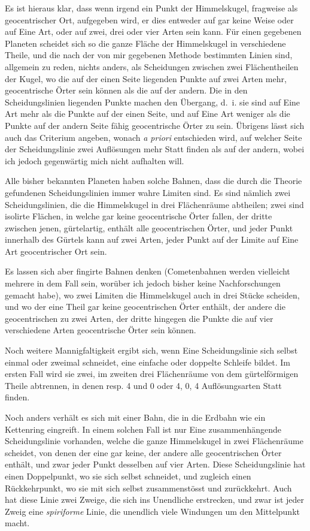 \documentclass[11pt,a4paper]{book}
\begin{document}
Es ist hieraus klar, dass wenn irgend ein Punkt der Himmelskugel, fragweise als geocentrischer Ort, aufgegeben wird, er dies entweder auf gar keine Weise oder auf Eine Art, oder auf zwei, drei oder vier Arten sein kann. Für einen gegebenen Planeten scheidet sich so die ganze Fläche der Himmelskugel in verschiedene Theile, und die nach der von mir gegebenen Methode bestimmten Linien sind, allgemein zu reden, nichts anders, als Scheidungen zwischen zwei Flächentheilen der Kugel, wo die auf der einen Seite liegenden Punkte auf zwei Arten mehr, geocentrische Örter sein können als die auf der andern. Die in den Scheidungslinien liegenden Punkte machen den Übergang, d.~i. sie sind auf Eine Art mehr als die Punkte auf der einen Seite, und auf Eine Art weniger als die Punkte auf der andern Seite fähig geocentrische Örter zu sein. Übrigens lässt sich auch das Criterium angeben, wonach \textit{a priori} entschieden wird, auf welcher Seite der Scheidungslinie zwei Auflösungen mehr Statt finden als auf der andern, wobei ich jedoch gegenwärtig mich nicht aufhalten will.

Alle bisher bekannten Planeten haben solche Bahnen, dass die durch die Theorie gefundenen Scheidungslinien immer wahre Limiten sind. Es sind nämlich zwei Scheidungslinien, die die Himmelskugel in drei Flächenräume abtheilen; zwei sind isolirte Flächen, in welche gar keine geocentrische Örter fallen, der dritte zwischen jenen, gürtelartig, enthält alle geocentrischen Örter, und jeder Punkt innerhalb des Gürtels kann auf zwei Arten, jeder Punkt auf der Limite auf Eine Art geocentrischer Ort sein.

Es lassen sich aber fingirte Bahnen denken (Cometenbahnen werden vielleicht mehrere in dem Fall sein, worüber ich jedoch bisher keine Nachforschungen gemacht habe), wo zwei Limiten die Himmelskugel auch in drei Stücke scheiden, und wo der eine Theil gar keine geocentrischen Örter enthält, der andere die geocentrischen zu zwei Arten, der dritte hingegen die Punkte die auf vier verschiedene Arten geocentrische Örter sein können.

Noch weitere Mannigfaltigkeit ergibt sich, wenn Eine Scheidungslinie sich selbst einmal oder zweimal schneidet, eine einfache oder doppelte Schleife bildet. Im ersten Fall wird sie zwei, im zweiten drei Flächenräume von dem gürtelförmigen Theile abtrennen, in denen resp. 4 und 0 oder 4, 0, 4 Auflösungsarten Statt finden.

Noch anders verhält es sich mit einer Bahn, die in die Erdbahn wie ein Kettenring eingreift. In einem solchen Fall ist nur Eine zusammenhängende Scheidungslinie vorhanden, welche die ganze Himmelskugel in zwei Flächenräume scheidet, von denen der eine gar keine, der andere alle geocentrischen Örter enthält, und zwar jeder Punkt desselben auf vier Arten. Diese Scheidungslinie hat einen Doppelpunkt, wo sie sich selbst schneidet, und zugleich einen Rückkehrpunkt, wo sie mit sich selbst zusammenstösst und zurückkehrt. Auch hat diese Linie zwei Zweige, die sich ins Unendliche erstrecken, und zwar ist jeder Zweig eine \textit{spiriforme} Linie, die unendlich viele Windungen um den Mittelpunkt macht.
\end{document}
